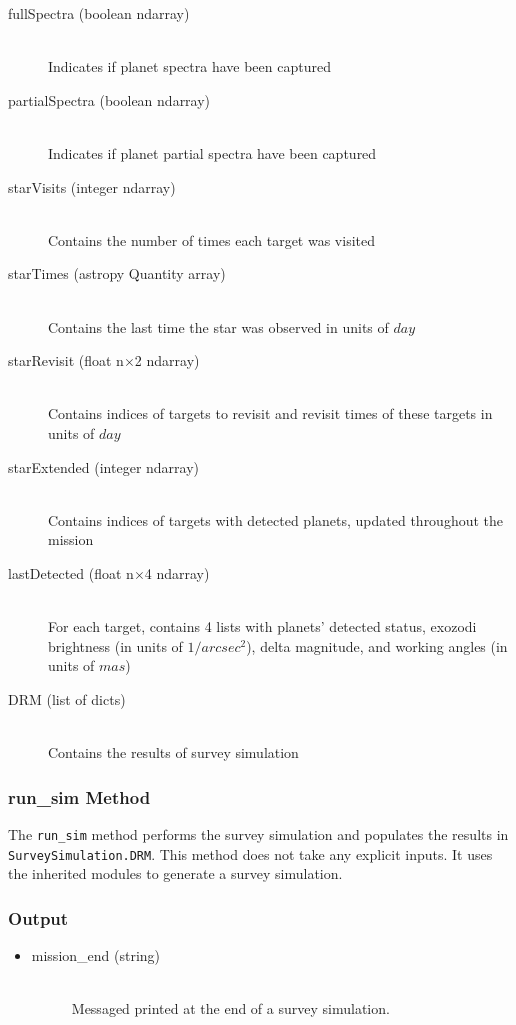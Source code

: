 \documentclass[cleanfoot]{asme2ej}
\begin{document}
\begin{itemize}
\begin{description}
    \item[fullSpectra (boolean ndarray)] \hfill \\ Indicates if planet spectra have been captured
    \item[partialSpectra (boolean ndarray)] \hfill \\ Indicates if planet partial spectra have been captured
    \item[starVisits (integer ndarray)] \hfill \\ Contains the number of times each target was visited
    \item[starTimes (astropy Quantity array)] \hfill \\ Contains the last time the star was observed in units of $day$
    \item[starRevisit (float n$\times$2 ndarray)] \hfill \\ Contains indices of targets to revisit and revisit times of these targets in units of $day$
    \item[starExtended (integer ndarray)] \hfill \\ Contains indices of targets with detected planets, updated throughout the mission
    \item[lastDetected (float n$\times$4 ndarray)] \hfill \\ For each target, contains 4 lists with planets' detected status, exozodi brightness (in units of $1/arcsec^2$), delta magnitude, and working angles (in units of $mas$)
    \item[DRM (list of dicts)] \hfill \\ Contains the results of survey simulation
\end{description}
\end{itemize}

\subsubsection{run\_sim Method} \label{sec:runsimtask}
The \verb+run_sim+ method performs the survey simulation and populates the results in \verb+SurveySimulation.DRM+. This method does not take any explicit inputs.  It uses the inherited modules to generate a survey simulation.

\subsubsection*{Output}
\begin{itemize}
\item
\begin{description}
    \item[mission\_end (string)] \hfill \\ Messaged printed at the end of a survey simulation.
\end{description}
\end{itemize}
\end{document}

